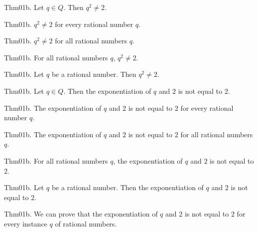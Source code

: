 \documentclass{article}
\begin{document}
Thm01b. Let $q \in Q$. Then $q ^ {2}\neq 2$.

Thm01b. $q ^ {2}\neq 2$ for every rational number $q$.

Thm01b. $q ^ {2}\neq 2$ for all rational numbers $q$.

Thm01b. For all rational numbers $q$, $q ^ {2}\neq 2$.

Thm01b. Let $q$ be a rational number. Then $q ^ {2}\neq 2$.

Thm01b. Let $q \in Q$. Then the exponentiation of $q$ and $2$ is not equal to $2$.

Thm01b. The exponentiation of $q$ and $2$ is not equal to $2$ for every rational number $q$.

Thm01b. The exponentiation of $q$ and $2$ is not equal to $2$ for all rational numbers $q$.

Thm01b. For all rational numbers $q$, the exponentiation of $q$ and $2$ is not equal to $2$.

Thm01b. Let $q$ be a rational number. Then the exponentiation of $q$ and $2$ is not equal to $2$.

Thm01b. We can prove that the exponentiation of $q$ and $2$ is not equal to $2$ for every instance $q$ of rational numbers.
\end{document}
